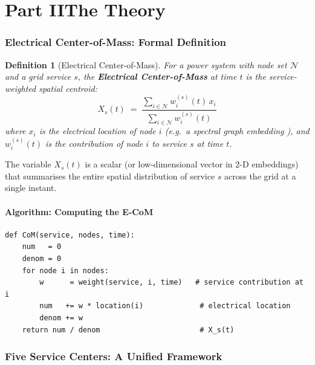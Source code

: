 \documentclass[12pt, a4paper]{article}
\newtheorem{definition}{Definition}[section]
\begin{document}
\part*{Part II\quad The Theory}

\section{Electrical Center-of-Mass: Formal Definition}
\label{sec:ecom_def}

\begin{definition}[Electrical Center-of-Mass]
\label{def:ecom}
For a power system with node set $\mathcal{N}$ and a grid service $s$, the
\textbf{Electrical Center-of-Mass} at time $t$ is the service-weighted spatial
centroid:
\begin{equation}
  X_s(t) \;=\; \frac{\displaystyle\sum_{i \in \mathcal{N}} w_i^{(s)}(t)\, x_i}
                     {\displaystyle\sum_{i \in \mathcal{N}} w_i^{(s)}(t)}
  \label{eq:ecom}
\end{equation}
where $x_i$ is the electrical location of node $i$ (e.g.\ a spectral graph
embedding \citep{fiedler1973algebraic}), and $w_i^{(s)}(t)$ is the contribution
of node $i$ to service $s$ at time $t$.
\end{definition}

\noindent
The variable $X_s(t)$ is a scalar (or low-dimensional vector in 2-D embeddings)
that summarises the entire spatial distribution of service $s$ across the grid
at a single instant.

\subsection*{Algorithm: Computing the E-CoM}

\begin{lstlisting}[caption={Computing the Electrical Center-of-Mass},
                   label={lst:ecom}]
def CoM(service, nodes, time):
    num   = 0
    denom = 0
    for node i in nodes:
        w      = weight(service, i, time)   # service contribution at i
        num   += w * location(i)             # electrical location
        denom += w
    return num / denom                       # X_s(t)
\end{lstlisting}

\section{Five Service Centers: A Unified Framework}
\label{sec:five_centers}
\end{document}
